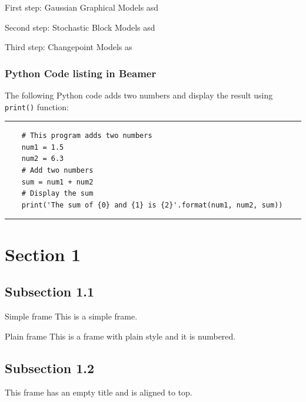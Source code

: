 \begin{frame}{First step: Gaussian Graphical Models}
    asd
\end{frame}

\begin{frame}{Second step: Stochastic Block Models}
    asd
\end{frame}

\begin{frame}{Third step: Changepoint Models}
    as
\end{frame}


\begin{frame}[fragile]
\frametitle{Python Code listing in Beamer}
The following Python code adds two numbers and display the result using \verb|print()| function:
\rule{\textwidth}{1pt}
\scriptsize
\begin{verbatim}
    # This program adds two numbers
    num1 = 1.5
    num2 = 6.3
    # Add two numbers
    sum = num1 + num2
    # Display the sum
    print('The sum of {0} and {1} is {2}'.format(num1, num2, sum))
\end{verbatim}
\rule{\textwidth}{1pt}
\end{frame}


    \section{Section 1}
    \subsection{Subsection 1.1}
    \begin{frame}{Simple frame}
        This is a simple frame.
    \end{frame}

    \begin{frame}[plain]{Plain frame}
        This is a frame with plain style and it is numbered.
    \end{frame}
    
    \subsection{Subsection 1.2}
    \begin{frame}[t]
        This frame has an empty title and is aligned to top.
    \end{frame}
    
